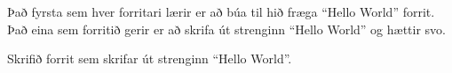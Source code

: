 \begin{problem}
	Það fyrsta sem hver forritari lærir er að búa til hið fræga "`Hello World"' forrit. Það eina sem forritið gerir er að skrifa út strenginn "`Hello World"' og hættir svo.

	Skrifið forrit sem skrifar út strenginn "`Hello World"'.

\begin{example}
%
\end{example}
\end{problem}